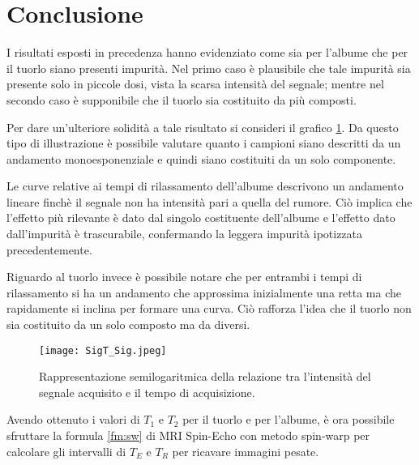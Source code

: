 \section*{Conclusione}
I risultati esposti in precedenza hanno evidenziato come sia per l'albume che per il tuorlo siano presenti impurità.
Nel primo caso è plausibile che tale impurità sia presente solo in piccole dosi, vista la scarsa intensità del segnale; mentre nel secondo caso è supponibile che il tuorlo sia costituito da più composti.

Per dare un'ulteriore solidità a tale risultato si consideri il grafico \ref{fig:SigT_Sig}. 
Da questo tipo di illustrazione è possibile valutare quanto i campioni siano descritti da un andamento monoesponenziale e quindi siano costituiti da un solo componente.

Le curve relative ai tempi di rilassamento dell'albume descrivono un andamento lineare finchè il segnale non ha intensità pari a quella del rumore. 
Ciò implica che l'effetto più rilevante è dato dal singolo costituente dell'albume e l'effetto dato dall'impurità è trascurabile, confermando la leggera impurità ipotizzata precedentemente.

Riguardo al tuorlo invece è possibile notare che per entrambi i tempi di rilassamento si ha un andamento che approssima inizialmente una retta ma che rapidamente si inclina per formare una curva.
Ciò rafforza l'idea che il tuorlo non sia costituito da un solo composto ma da diversi.

\begin{figure}[h!]
\centering
\texttt{[image: SigT\_Sig.jpeg]}
\caption{Rappresentazione semilogaritmica della relazione tra l'intensità del segnale acquisito e il tempo di acquisizione.}\label{fig:SigT_Sig}
\end{figure}
\newpage


Avendo ottenuto i valori di $T_1$ e $T_2$ per il tuorlo e per l'albume, è ora possibile sfruttare la formula \ref{fm:sw} di MRI Spin-Echo con metodo spin-warp per calcolare gli intervalli di $T_E$ e $T_R$ per ricavare immagini pesate.

